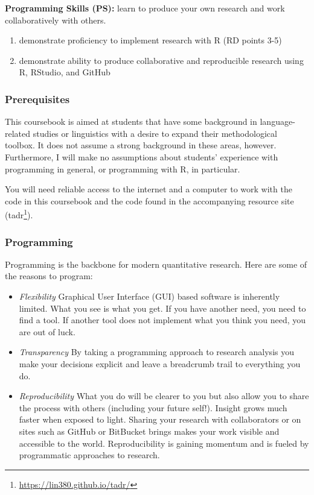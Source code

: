 \documentclass[
]{article}
\DeclareRobustCommand{\href}[2]{#2\footnote{\url{#1}}}
\providecommand{\tightlist}{%
  \setlength{\itemsep}{0pt}\setlength{\parskip}{0pt}}
\begin{document}
\textbf{Programming Skills (PS):} learn to produce your own research and work collaboratively with others.

\begin{enumerate}
\def\labelenumi{\arabic{enumi}.}
\tightlist
\item
  demonstrate proficiency to implement research with R (RD points 3-5)
\item
  demonstrate ability to produce collaborative and reproducible research using R, RStudio, and GitHub
\end{enumerate}

\hypertarget{prerequisites}{%
\subsubsection*{Prerequisites}\label{prerequisites}}

This coursebook is aimed at students that have some background in language-related studies or linguistics with a desire to expand their methodological toolbox. It does not assume a strong background in these areas, however. Furthermore, I will make no assumptions about students' experience with programming in general, or programming with R, in particular.

You will need reliable access to the internet and a computer to work with the code in this coursebook and the code found in the accompanying resource site (\href{https://lin380.github.io/tadr/}{tadr}).

\hypertarget{programming}{%
\subsubsection*{Programming}\label{programming}}

Programming is the backbone for modern quantitative research. Here are some of the reasons to program:

\begin{itemize}
\tightlist
\item
  \emph{Flexibility} Graphical User Interface (GUI) based software is inherently limited. What you see is what you get. If you have another need, you need to find a tool. If another tool does not implement what you think you need, you are out of luck.
\item
  \emph{Transparency} By taking a programming approach to research analysis you make your decisions explicit and leave a breadcrumb trail to everything you do.
\item
  \emph{Reproducibility} What you do will be clearer to you but also allow you to share the process with others (including your future self!). Insight grows much faster when exposed to light. Sharing your research with collaborators or on sites such as GitHub or BitBucket brings makes your work visible and accessible to the world. Reproducibility is gaining momentum and is fueled by programmatic approaches to research.
\end{itemize}
\end{document}
